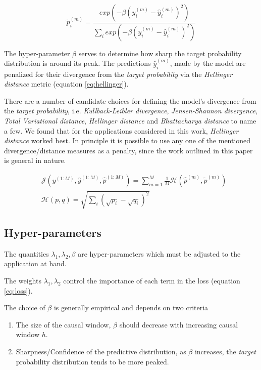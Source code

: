 \documentclass[twoside]{article}
\begin{document}
\begin{equation}\label{eq:targetprob}
\widetilde{p}_{i}^{(m)} = \frac{exp \left(- \beta (y_{i}^{(m)} - \hat{y}_{i}^{(m)})^{2} \right)}{\sum_{i}{exp \left(- \beta (y_{i}^{(m)} - \hat{y}_{i}^{(m)})^{2} \right)}} 
\end{equation}

The hyper-parameter $\beta$ serves to determine how sharp the target probability distribution is around its peak. The predictions $\hat{y}^{(m)}_{i}$, made by the model are penalized for their divergence from the \emph{target probability} via the \emph{Hellinger distance} metric (equation \ref{eq:hellinger}).


There are a number of candidate choices for defining the model's divergence from the \emph{target probability}, i.e.  \emph{Kullback-Leibler divergence}, \emph{Jensen-Shannon divergence}, \emph{Total Variational distance}, \emph{Hellinger distance} and \emph{Bhattacharya distance} to name a few. We found that for the applications considered in this work, \emph{Hellinger distance} worked best. In principle it is possible to use any one of the mentioned divergence/distance measures as a penalty, since the work outlined in this paper is general in nature.

\begin{align}\label{eq:prior}
& \mathcal{J}(y^{(1:M)}, \hat{y}^{(1:M)}, \hat{p}^{(1:M)}) = \sum_{m = 1}^{M}{\frac{1}{M} \mathcal{H}(\hat{p}^{(m)}, \widetilde{p}^{(m)})} \\
& \mathcal{H}(p, q) = \sqrt{\sum_{i}{(\sqrt{p_i} -  \sqrt{q_i})^2}} \label{eq:hellinger}
\end{align}


\subsection{Hyper-parameters}

The quantities $\lambda_1, \lambda_2, \beta$ are hyper-parameters which must be adjusted to the application at hand.

The weights $\lambda_1, \lambda_2$ control the importance of each term in the loss (equation \ref{eq:loss}).

The choice of $\beta$ is generally empirical and depends on two criteria 
\begin{enumerate} \item The size of the causal window, $\beta$ should decrease with increasing causal window $h$. 
\item Sharpness/Confidence of the predictive distribution, as $\beta$ increases, the \emph{target} probability distribution tends to be more peaked.  \end{enumerate}
\end{document}
